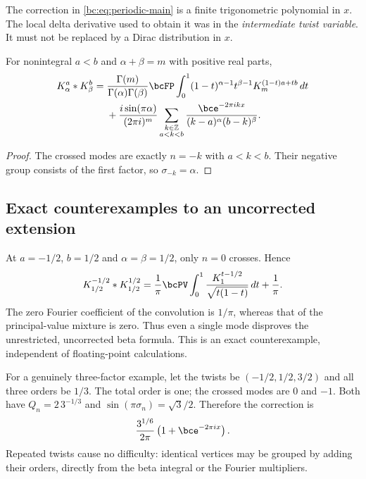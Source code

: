 The correction in \eqref{bc:eq:periodic-main} is a finite trigonometric
polynomial in $x$. The local delta derivative used to obtain it was in
the \emph{intermediate twist variable}. It must not be replaced by a
Dirac distribution in $x$.

\begin{corollary}
\label{bc:cor:two-twists}
For nonintegral $a<b$ and $\alpha+\beta=m$ with positive real parts,
\begin{align}
 K_\alpha^a*K_\beta^b
 ={}&\frac{\Gamma(m)}{\Gamma(\alpha)\Gamma(\beta)}
 \bcFP\int_0^1(1-t)^{\alpha-1}t^{\beta-1}
                            K_m^{(1-t)a+tb}\,dt\notag\\
 &+\frac{i\sin(\pi\alpha)}{(2\pi i)^m}
     \sum_{\substack{k\in\mathbb Z\\a<k<b}}
       \frac{\bce^{-2\pi i kx}}{(k-a)^\alpha(b-k)^\beta}.
 \label{bc:eq:two-twist-main}
\end{align}
\end{corollary}
\begin{proof}
The crossed modes are exactly $n=-k$ with $a<k<b$. Their negative group
consists of the first factor, so $\sigma_{-k}=\alpha$.
\end{proof}

\subsection{Exact counterexamples to an uncorrected extension}

At $a=-1/2$, $b=1/2$ and $\alpha=\beta=1/2$, only $n=0$ crosses. Hence
\begin{equation}\label{bc:eq:half-counterexample}
 K_{1/2}^{-1/2}*K_{1/2}^{1/2}
 =\frac1\pi\bcPV\int_0^1
      \frac{K_1^{t-1/2}}{\sqrt{t(1-t)}}\,dt+\frac1\pi.
\end{equation}
The zero Fourier coefficient of the convolution is $1/\pi$, whereas
that of the principal-value mixture is zero. Thus even a single mode
disproves the unrestricted, uncorrected beta formula. This is an exact
counterexample, independent of floating-point calculations.

For a genuinely three-factor example, let the twists be
$(-1/2,1/2,3/2)$ and all three orders be $1/3$. The total order is one;
the crossed modes are $0$ and $-1$. Both have
$Q_n=2\,3^{-1/3}$ and $\sin(\pi\sigma_n)=\sqrt3/2$. Therefore the
correction is
\begin{equation}\label{bc:eq:three-example}
 \frac{3^{1/6}}{2\pi}\left(1+\bce^{-2\pi i x}\right).
\end{equation}
Repeated twists cause no difficulty: identical vertices may be grouped
by adding their orders, directly from the beta integral or the Fourier
multipliers.

